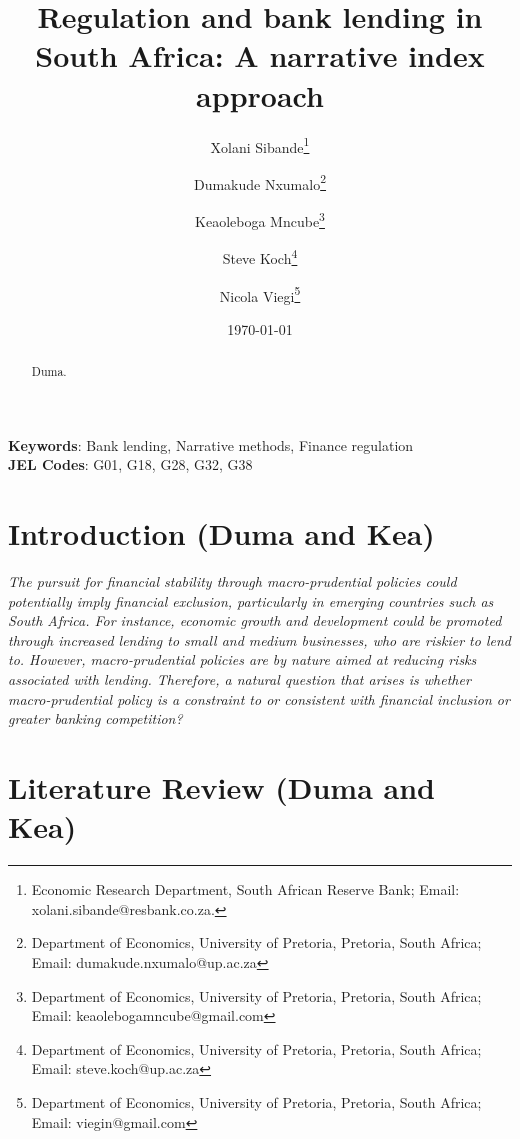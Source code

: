 \documentclass[
  letterpaper,
  DIV=11,
  numbers=noendperiod]{scrartcl}
\author{}
\date{}
\begin{document}
\title{Regulation and bank lending in South Africa: A narrative index approach}





\author {Xolani Sibande\footnote{Economic Research Department, South African Reserve Bank; Email: xolani.sibande@resbank.co.za.} \and
Dumakude Nxumalo\footnote{Department of Economics, University of Pretoria, Pretoria, South Africa; Email: dumakude.nxumalo@up.ac.za} \and
Keaoleboga Mncube\footnote{Department of Economics, University of Pretoria, Pretoria, South Africa; Email: keaolebogamncube@gmail.com} \and
Steve Koch\footnote{Department of Economics, University of Pretoria, Pretoria, South Africa; Email: steve.koch@up.ac.za} \and
Nicola Viegi\footnote{Department of Economics, University of Pretoria, Pretoria, South Africa; Email: viegin@gmail.com}}


\date{\today}
\maketitle

\begin{abstract}
Duma.

\end{abstract}

\noindent\textbf{Keywords}: Bank lending, Narrative methods, Finance regulation\\
\textbf{JEL Codes}: G01, G18, G28, G32, G38
\newpage

\section{Introduction (Duma and Kea)}\label{introduction-duma-and-kea}

\textit{The pursuit for financial stability through macro-prudential policies could potentially imply financial exclusion, particularly in emerging countries such as South Africa. For instance, economic growth and development could be promoted through increased lending to small and medium businesses, who are riskier to lend to. However, macro-prudential policies are by nature aimed at reducing risks associated with lending. Therefore, a natural question that arises is whether macro-prudential policy is a constraint to or consistent with financial inclusion or greater banking competition?}

\section{Literature Review (Duma and
Kea)}\label{literature-review-duma-and-kea}
\end{document}
